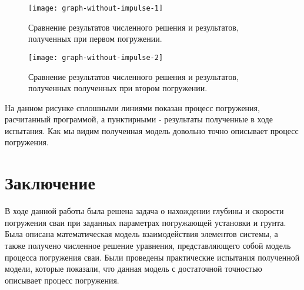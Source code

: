 \begin{figure}[ht]
    \centering
    \texttt{[image: graph-without-impulse-1]}
    \caption{Сравнение результатов численного решения и результатов, полученных при первом погружении.}
    \label{fig:graph-without-impulse-1}
\end{figure}

\begin{figure}[ht]
    \centering
    \texttt{[image: graph-without-impulse-2]}
    \caption{Сравнение результатов численного решения и результатов, полученных полученных при втором погружении.}
    \label{fig:graph-without-impulse-2}
\end{figure}

На данном рисунке сплошными линиями показан процесс погружения, расчитанный программой,
а пунктирными - результаты полученные в ходе испытания. Как мы видим полученная модель довольно
точно описывает процесс погружения.

\clearpage

\section*{Заключение}

В ходе данной работы была решена задача о нахождении глубины и скорости погружения сваи при заданных параметрах погружающей
установки и грунта. Была описана математическая модель взаимодействия элементов системы, а также получено численное решение
уравнения, представляющего собой модель процесса погружения сваи. Были проведены практические испытания полученной модели,
которые показали, что данная модель с достаточной точностью описывает процесс погружения.

\clearpage


\nocite{*}

\printbibliography{}